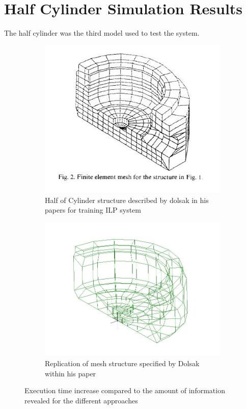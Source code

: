 \section{Half Cylinder Simulation Results}
The half cylinder was the third model used to test the system. 




\begin{figure}[H]
\centering
\begin{subfigure}{.5\textwidth}
  \centering
  \includegraphics[width=0.9\linewidth]{../Graphics/HalfCylinder/DolsakCylinderMeshed.jpeg}
  \caption{Half of Cylinder structure described by dolsak in his papers for training ILP system}
  \label{fig:sub1}
\end{subfigure}%
\begin{subfigure}{.5\textwidth}
  \centering
  \includegraphics[width=0.9\linewidth]{../Graphics/HalfCylinder/DolsakCylinderWithinLisa.jpeg}
  \caption{Replication of mesh structure specified by Dolsak within his paper \cite{DolsakPaper91}}
  \label{fig:sub2}
\end{subfigure}
\label{fig:test}
  \caption{Execution time increase compared to the amount of information revealed for the different approaches}
 \end{figure}
 
